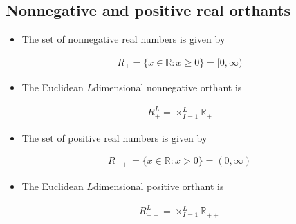 \documentclass[letterpaper,10pt,english]{jupyterBook}
\begin{document}
\subsection{Non\sphinxhyphen{}negative and positive real orthants}
\label{\detokenize{02.sets_numbers_coordinates_distances:non-negative-and-positive-real-orthants}}\begin{itemize}
\item {} 
\sphinxAtStartPar
The set of non\sphinxhyphen{}negative real numbers is given by

\end{itemize}
\begin{equation*}
\begin{split}R_+ = \{x \in \mathbb{R} : x \geqslant 0\} = [0, \infty)\end{split}
\end{equation*}\begin{itemize}
\item {} 
\sphinxAtStartPar
The Euclidean \(L\)\sphinxhyphen{}dimensional non\sphinxhyphen{}negative orthant is

\end{itemize}
\begin{equation*}
\begin{split}R^L_+ = \times_{I = 1}^L \mathbb{R}_+\end{split}
\end{equation*}\begin{itemize}
\item {} 
\sphinxAtStartPar
The set of positive real numbers is given by

\end{itemize}
\begin{equation*}
\begin{split}R_{++} = \{x \in \mathbb{R} : x > 0\} = (0, \infty)\end{split}
\end{equation*}\begin{itemize}
\item {} 
\sphinxAtStartPar
The Euclidean \(L\)\sphinxhyphen{}dimensional positive orthant is

\end{itemize}
\begin{equation*}
\begin{split}R^L_{++} = \times_{I = 1}^L \mathbb{R}_{++}\end{split}
\end{equation*}
\end{document}
